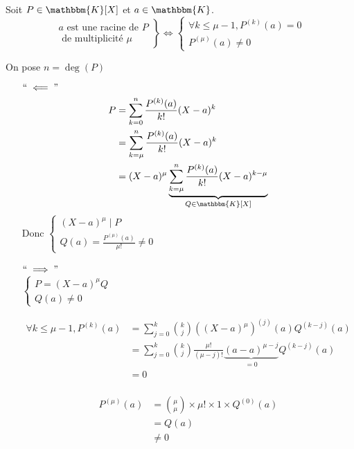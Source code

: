 \begin{prop}
	Soit $P \in \mathbbm{K}[X]$ et $a \in \mathbbm{K}$. \[
		\left.\begin{array}{r}
			a \text{ est une racine de } P\\
			\text{ de multiplicité } \mu
		\end{array}\right\} \iff \left\{\begin{array}{l}
			\forall k \le \mu-1, P^{(k)}(a) = 0\\[1mm]
			P^{(\mu)}(a) \neq 0
		\end{array}\right.
	\] 
\end{prop}

\begin{prv}
	On pose $n = \deg(P)$\\
	 \begin{itemize}
		\item[$``\impliedby"$ ]
			\begin{align*}
				P &= \sum_{k=0}^n \frac{P^{(k)}(a)}{k!}(X-a)^{k}\\
				&= \sum_{k=\mu}^n \frac{P^{(k)}(a)}{k!} (X-a)^k \\
				&= (X-a)^\mu \underbrace{\sum_{k=\mu}^n \frac{P^{(k)}(a)}{k!} (X-a)^{k-\mu}}_{Q \in \mathbbm{K}[X]} \\
			\end{align*}
			Donc $\begin{cases}
				(X-a)^\mu  \mid  P\\
				Q(a) = \frac{P^{(\mu)}(a)}{\mu!} \neq 0
			\end{cases}$ 
		\item[$``\implies"$]~\\
			$\begin{cases}
				 P = (X-a)^{\mu} Q\\
				 Q(a) \neq 0
			\end{cases}$ 

			\begin{align*}
				\forall k \le \mu - 1, 
				P^{(k)}(a) &= \sum_{j=0}^k {k \choose j} \left( (X-a)^\mu \right)^{(j)} (a) Q^{(k-j)}(a) \\
				&= \sum_{j=0}^k {k \choose j} \frac{\mu!}{(\mu-j)!} \underbrace{(a-a)^{\mu-j}}_{ = 0} Q^{(k-j)}(a) \\
				&= 0 \\
			\end{align*}

			\begin{align*}
				P^{(\mu)}(a) &= {\mu \choose \mu} \times \mu! \times 1 \times Q^{(0)}(a) \\
				&= Q(a) \\
				&\neq 0
			\end{align*}
	\end{itemize}
\end{prv}

